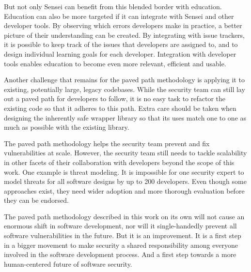 But not only Sensei can benefit from this blended border with education.
Education can also be more targeted if it can integrate with Sensei and other developer tools. By observing which errors developers make in practice, a better picture of their understanding can be created.
By integrating with issue trackers, it is possible to keep track of the issues that developers are assigned to, and to design individual learning goals for each developer.
Integration with developer tools enables education to become even more relevant, efficient and usable.

Another challenge that remains for the paved path methodology is applying it to existing, potentially large, legacy codebases. While the security team can still lay out a paved path for developers to follow, it is no easy task to refactor the existing code so that it adheres to this path. 
Extra care should be taken when designing the inherently safe wrapper library so that its uses match one to one as much as possible with the existing library. 

The paved path methodology helps the security team prevent and fix vulnerabilities at scale.
However, the security team still needs to tackle scalability in other facets of their collaboration with developers beyond the scope of this work.
One example is threat modeling.
It is impossible for one security expert to model threats for all software designs by up to 200 developers. 
Even though some approaches exist, they need wider adoption and more thorough evaluation before they can be endorsed.



The paved path methodology described in this work on its own will not cause an enormous shift in software development, nor will it single-handedly prevent all software vulnerabilities in the future.
But it is an improvement. It is a first step in a bigger movement to make security a shared responsibility among everyone involved in the software development process. And a first step towards a more human-centered future of software security.

